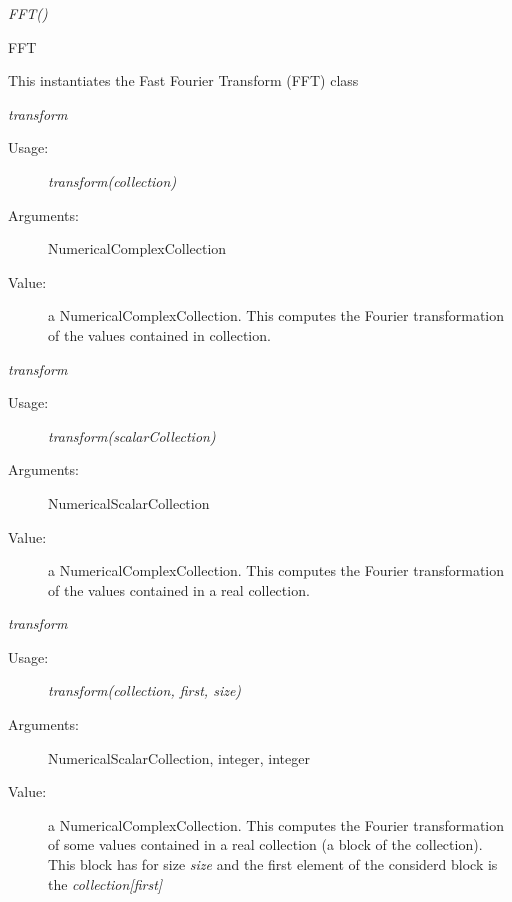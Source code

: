 \begin{description}

\item[Usage:] \rule{0pt}{1em}
\begin{description}
\item \textit{FFT()}
\item
\end{description}

\item[Value:] FFT
\begin{description}
\item This instantiates the Fast Fourier Transform (FFT) class
\end{description}

\item[Some methods :]  \rule{0pt}{1em}

\item \textit{transform}
\begin{description}
\item[Usage:] \textit{transform(collection)}
\item[Arguments:] NumericalComplexCollection
\item[Value:] a NumericalComplexCollection. This computes the Fourier transformation of the values contained in collection.
\end{description}
\bigskip

\item \textit{transform}
\begin{description}
\item[Usage:] \textit{transform(scalarCollection)}
\item[Arguments:] NumericalScalarCollection
\item[Value:] a NumericalComplexCollection. This computes the Fourier transformation of the values contained in a real collection.
\end{description}
\bigskip

\item \textit{transform}
\begin{description}
\item[Usage:] \textit{transform(collection, first, size)}
\item[Arguments:] NumericalScalarCollection, integer, integer
\item[Value:] a NumericalComplexCollection. This computes the Fourier transformation of some values contained in a real collection (a block of the collection).
This block has for size \textit{size} and the first element of the considerd block is the \textit{collection[first]}
\end{description}
\bigskip


\end{description}
